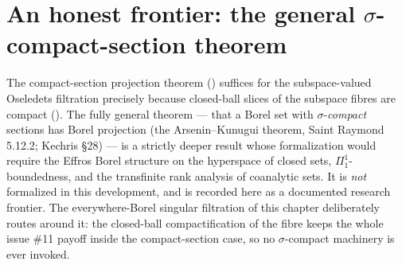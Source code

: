 \section{An honest frontier: the general \texorpdfstring{\(\sigma\)}{sigma}-compact-section theorem}

The compact-section projection theorem () suffices for the subspace-valued
Oseledets filtration precisely because closed-ball slices of the subspace fibres are compact
(). The fully general theorem --- that a Borel set with
\(\sigma\)-\emph{compact} sections has Borel projection (the Arsenin--Kunugui theorem, Saint
Raymond 5.12.2; Kechris \S28) --- is a strictly deeper result whose formalization would require the
Effros Borel structure on the hyperspace of closed sets, \(\Pi^1_1\)-boundedness, and the
transfinite rank analysis of coanalytic sets. It is \emph{not} formalized in this development, and
is recorded here as a documented research frontier. The everywhere-Borel singular filtration of
this chapter deliberately routes around it: the closed-ball compactification of the fibre keeps the
whole issue \#11 payoff inside the compact-section case, so no \(\sigma\)-compact machinery is ever
invoked.
